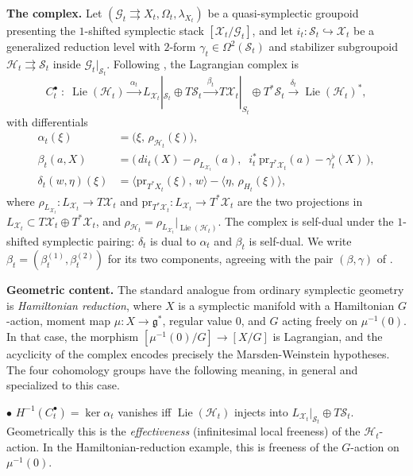 \documentclass[reqno]{amsart}
\theoremstyle{plain}
\theoremstyle{definition}
\newcommand{\G}{\mathcal{G}}
\renewcommand{\H}{\mathcal{H}}
\newcommand{\g}{\mathfrak{g}}
\newcommand{\pr}{\mathrm{pr}}
\renewcommand{\S}{\mathcal{S}}
\newcommand{\X}{\mathcal{X}}
\newcommand{\Lie}{\operatorname{Lie}}
\begin{document}
\medskip
\noindent\textbf{The complex.} Let
$(\mathcal{G}_t \rightrightarrows X_t, \Omega_t, \lambda_{X_t})$ be a
quasi-symplectic groupoid presenting the $1$-shifted symplectic stack
$[\X_t / \G_t]$, and let $i_t \colon \S_t \hookrightarrow \X_t$
be a generalized reduction level with $2$-form $\gamma_t \in \Omega^2(\S_t)$
and stabilizer subgroupoid $\H_t \rightrightarrows \S_t$ inside
$\G_t|_{\S_t}$. Following \cite[Equation (5.9)]{bualibanu2026reduction},
the Lagrangian complex is
\begin{equation}\label{eq:lagrangian-complex}
   C_t^\bullet \;:\;
   \Lie(\H_t)
   \xrightarrow{\;\alpha_t\;}
   L_{\X_t}|_{\S_t} \oplus T\S_t
   \xrightarrow{\;\beta_t\;}
   T\X_t|_{S_t} \oplus T^*\S_t
   \xrightarrow{\;\delta_t\;}
   \Lie(\H_t)^*,
\end{equation}
with differentials
\begin{align*}
   \alpha_t(\xi) &= \bigl(\xi,\, \rho_{\H_t}(\xi)\bigr),\\
   \beta_t(a, X) &= \bigl(\,di_t(X) - \rho_{L_{\X_t}}(a),\;\;
                          i_t^{*}\,\pr_{T^*\X_t}(a) - \gamma_t^\flat(X)\,\bigr),\\
   \delta_t(w, \eta)(\xi) &= \langle \pr_{T^*X_t}(\xi),\, w\rangle
                            - \langle \eta,\, \rho_{H_t}(\xi)\rangle,
\end{align*}
where $\rho_{L_{\X_t}}\colon L_{\X_t} \to T\X_t$ and
$\pr_{T^*\X_t}\colon L_{\X_t} \to T^*\X_t$ are the two projections in $L_{\X_t} \subset T\X_t \oplus T^*\X_t$, and
$\rho_{\H_t} = \rho_{L_{\X_t}}|_{\Lie(\H_t)}$. The complex is self-dual under the $1$-shifted symplectic pairing: $\delta_t$ is dual to $\alpha_t$ and
$\beta_t$ is self-dual. We write
$\beta_t = (\beta_t^{(1)}, \beta_t^{(2)})$ for its two components, agreeing with the pair $(\beta, \gamma)$ of \cite[(5.9)]{bualibanu2026reduction}.
 
\medskip
\noindent\textbf{Geometric content.} The standard analogue from ordinary symplectic geometry is \emph{Hamiltonian reduction}, where $X$ is a
symplectic manifold with a Hamiltonian $G$-action, moment map
$\mu \colon X \to \g^*$, regular value $0$, and $G$ acting freely
on $\mu^{-1}(0)$. In that case, the morphism
$[\mu^{-1}(0)/G] \to [X/G]$ is Lagrangian, and the acyclicity of the complex encodes precisely the Marsden-Weinstein hypotheses. The four cohomology groups have the following meaning, in general and specialized to this case.
 
\smallskip
$\bullet$\; $H^{-1}(C_t^\bullet) = \ker \alpha_t$ vanishes iff
$\Lie(\H_t)$ injects into $L_{\X_t}|_{\S_t} \oplus T\S_t$. Geometrically this is the \emph{effectiveness} (infinitesimal local freeness) of the $\H_t$-action. In the Hamiltonian-reduction example, this is freeness of
the $G$-action on $\mu^{-1}(0)$.
 
\end{document}
